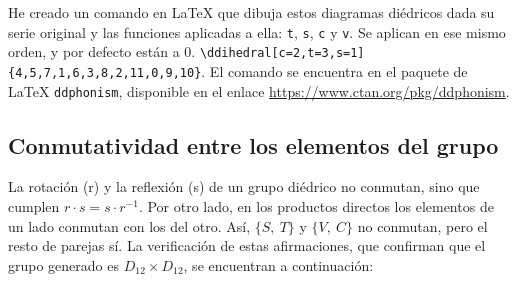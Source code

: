 	He creado un comando en \LaTeX{} que dibuja estos diagramas di\'edricos dada su serie original y las funciones aplicadas a ella: \verb|t|, \verb|s|, \verb|c| y \verb|v|. Se aplican en ese mismo orden, y por defecto est\'an a 0. \linebreak \verb|\ddihedral[c=2,t=3,s=1]{4,5,7,1,6,3,8,2,11,0,9,10}|. El comando se encuentra en el paquete de \LaTeX{} \texttt{ddphonism}, disponible en el enlace \url{https://www.ctan.org/pkg/ddphonism}.
	
	\subsection{Conmutatividad entre los elementos del grupo}		
		La rotaci\'on (r) y la reflexi\'on (s) de un grupo di\'edrico no conmutan, sino que cumplen $r\cdot s=s\cdot r^{-1}$. Por otro lado, en los productos directos los elementos de un lado conmutan con los del otro. As\'i, $\{S,\ T\}$ y $\{V,\ C\}$ no conmutan, pero el resto de parejas s\'i. La verificaci\'on de estas afirmaciones, que confirman que el grupo generado es $D_{12}\times{D}_{12}$, se encuentran a continuaci\'on:
